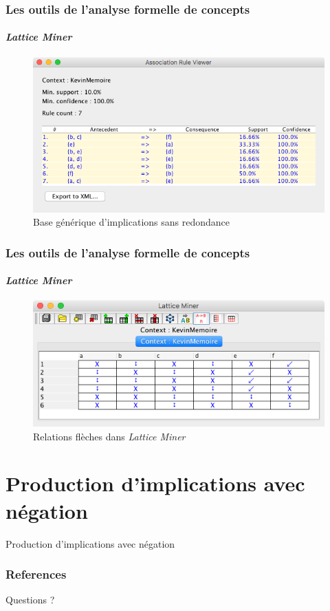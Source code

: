 \documentclass[french]{beamer}
\newcommand{\lm}{\emph{Lattice Miner}\xspace}
\begin{document}
\begin{frame}
\frametitle{Les outils de l'analyse formelle de concepts}
\framesubtitle{\lm}
\begin{figure}[H]
\caption{Base générique d'implications sans redondance}
\label{cap:fig:Imp-NonRed}
\begin{center}\includegraphics[scale=0.45]{figures/ImplNonRed.png}\end{center}
\end{figure}
\end{frame}
\begin{frame}
\frametitle{Les outils de l'analyse formelle de concepts}
\framesubtitle{\lm}
\begin{figure}[H]
\caption{Relations flèches dans \lm}
\label{cap:fig:lm-arrows}
\begin{center}\includegraphics[scale=0.45]{figures/lm-arrow.jpg}\end{center}
\end{figure}
\end{frame}

\section{Production d'implications avec négation}
\begin{frame}
\huge{\centerline{Production d'implications avec négation}}
\end{frame}

\begin{frame}[allowframebreaks]
\frametitle{References}
\printbibliography
\end{frame}
\begin{frame}
\Huge{\centerline{Questions ?}}
\end{frame}
\end{document}
